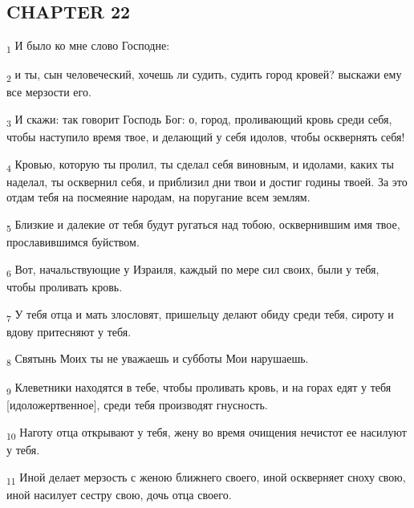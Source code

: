 \subsection{CHAPTER 22}
\begin{tcolorbox}
\textsubscript{1} И было ко мне слово Господне:
\end{tcolorbox}
\begin{tcolorbox}
\textsubscript{2} и ты, сын человеческий, хочешь ли судить, судить город кровей? выскажи ему все мерзости его.
\end{tcolorbox}
\begin{tcolorbox}
\textsubscript{3} И скажи: так говорит Господь Бог: о, город, проливающий кровь среди себя, чтобы наступило время твое, и делающий у себя идолов, чтобы осквернять себя!
\end{tcolorbox}
\begin{tcolorbox}
\textsubscript{4} Кровью, которую ты пролил, ты сделал себя виновным, и идолами, каких ты наделал, ты осквернил себя, и приблизил дни твои и достиг годины твоей. За это отдам тебя на посмеяние народам, на поругание всем землям.
\end{tcolorbox}
\begin{tcolorbox}
\textsubscript{5} Близкие и далекие от тебя будут ругаться над тобою, осквернившим имя твое, прославившимся буйством.
\end{tcolorbox}
\begin{tcolorbox}
\textsubscript{6} Вот, начальствующие у Израиля, каждый по мере сил своих, были у тебя, чтобы проливать кровь.
\end{tcolorbox}
\begin{tcolorbox}
\textsubscript{7} У тебя отца и мать злословят, пришельцу делают обиду среди тебя, сироту и вдову притесняют у тебя.
\end{tcolorbox}
\begin{tcolorbox}
\textsubscript{8} Святынь Моих ты не уважаешь и субботы Мои нарушаешь.
\end{tcolorbox}
\begin{tcolorbox}
\textsubscript{9} Клеветники находятся в тебе, чтобы проливать кровь, и на горах едят у тебя [идоложертвенное], среди тебя производят гнусность.
\end{tcolorbox}
\begin{tcolorbox}
\textsubscript{10} Наготу отца открывают у тебя, жену во время очищения нечистот ее насилуют у тебя.
\end{tcolorbox}
\begin{tcolorbox}
\textsubscript{11} Иной делает мерзость с женою ближнего своего, иной оскверняет сноху свою, иной насилует сестру свою, дочь отца своего.
\end{tcolorbox}
